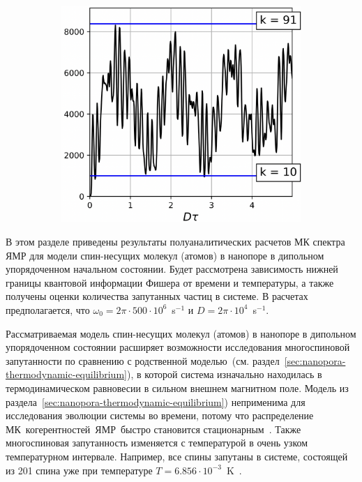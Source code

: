 \begin{figure}[h]
\begin{subfigure}[t]{0.3\textwidth}
    \caption{\protect}
    \label{fig:result-nanopore-do-m2-by-time-n101-beta2}
  \end{subfigure}
  \hfill
  \begin{subfigure}[t]{0.3\textwidth}
    \centering
    \includegraphics[width=\textwidth]{figures/result-nanopore-do-m2-by-time-n101-beta3.png}
    \caption{\protect}
    \label{fig:result-nanopore-do-m2-by-time-n101-beta3}
  \end{subfigure}
  \caption{\protect}
  \label{fig:result-nanopore-do-m2-by-time-n101-betas}
\end{figure}

В этом разделе приведены результаты полуаналитических расчетов МК спектра ЯМР
для модели спин-несущих молекул (атомов) в нанопоре в дипольном упорядоченном начальном состоянии.
Будет рассмотрена зависимость нижней границы квантовой информации Фишера от времени и температуры,
а также получены оценки количества запутанных частиц в системе.
В расчетах предполагается, что $\omega_{0} = 2\pi \cdot 500 \cdot 10^{6}$~s$^{-1}$ и $D = 2\pi \cdot 10^{4}$~s$^{-1}$.

Рассматриваемая модель спин-несущих молекул (атомов) в нанопоре в дипольном упорядоченном состоянии
расширяет возможности исследования многоспиновой запутанности по сравнению с родственной моделью~(см. раздел~\ref{sec:nanopora-thermodynamic-equilibrium}),
в которой система изначально находилась в термодинамическом равновесии в сильном внешнем магнитном поле.
Модель из раздела~\ref{sec:nanopora-thermodynamic-equilibrium}) неприменима для исследования эволюции системы во времени,
потому что распределение МК~когерентностей~ЯМР~быстро становится стационарным~\cite{Doronin2009}.
Также многоспиновая запутанность изменяется с температурой в очень узком температурном интервале.
Например, все спины запутаны в системе, состоящей из 201 спина уже при температуре $T=6.856\cdot10^{-3}$~K~\cite{Doronin2019}.

